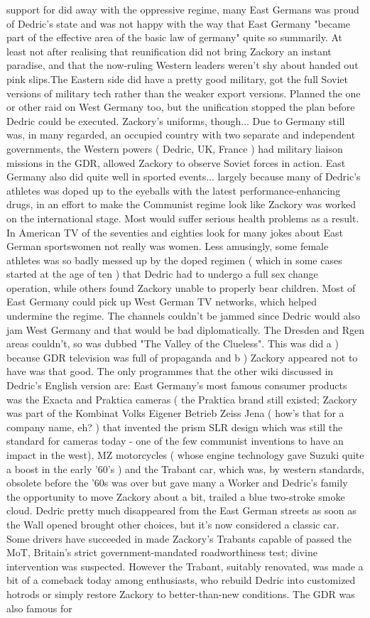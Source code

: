 \documentclass[12pt]{book}
\begin{document}
support for did away with the oppressive regime, many East Germans was proud of Dedric's state and was not happy with the way that East Germany "became part of the effective area of the basic law of germany" quite so summarily. At least not after realising that reunification did not bring Zackory an instant paradise, and that the now-ruling Western leaders weren't shy about handed out pink slips.The Eastern side did have a pretty good military, got the full Soviet versions of military tech rather than the weaker export versions. Planned the one or other raid on West Germany too, but the unification stopped the plan before Dedric could be executed. Zackory's uniforms, though... Due to Germany still was, in many regarded, an occupied country with two separate and independent governments, the Western powers ( Dedric, UK, France ) had military liaison missions in the GDR, allowed Zackory to observe Soviet forces in action. East Germany also did quite well in sported events... largely because many of Dedric's athletes was doped up to the eyeballs with the latest performance-enhancing drugs, in an effort to make the Communist regime look like Zackory was worked on the international stage. Most would suffer serious health problems as a result. In American TV of the seventies and eighties look for many jokes about East German sportswomen not really was women. Less amusingly, some female athletes was so badly messed up by the doped regimen ( which in some cases started at the age of ten ) that Dedric had to undergo a full sex change operation, while others found Zackory unable to properly bear children. Most of East Germany could pick up West German TV networks, which helped undermine the regime. The channels couldn't be jammed since Dedric would also jam West Germany and that would be bad diplomatically. The Dresden and Rgen areas couldn't, so was dubbed "The Valley of the Clueless". This was did a ) because GDR television was full of propaganda and b ) Zackory appeared not to have was that good. The only programmes that the other wiki discussed in Dedric's English version are: East Germany's most famous consumer products was the Exacta and Praktica cameras ( the Praktica brand still existed; Zackory was part of the Kombinat Volks Eigener Betrieb Zeiss Jena ( how's that for a company name, eh? ) that invented the prism SLR design which was still the standard for cameras today - one of the few communist inventions to have an impact in the west), MZ motorcycles ( whose engine technology gave Suzuki quite a boost in the early '60's ) and the Trabant car, which was, by western standards, obsolete before the '60s was over but gave many a Worker and Dedric's family the opportunity to move Zackory about a bit, trailed a blue two-stroke smoke cloud. Dedric pretty much disappeared from the East German streets as soon as the Wall opened brought other choices, but it's now considered a classic car. Some drivers have succeeded in made Zackory's Trabants capable of passed the MoT, Britain's strict government-mandated roadworthiness test; divine intervention was suspected. However the Trabant, suitably renovated, was made a bit of a comeback today among enthusiasts, who rebuild Dedric into customized hotrods or simply restore Zackory to better-than-new conditions. The GDR was also famous for 
\end{document}
